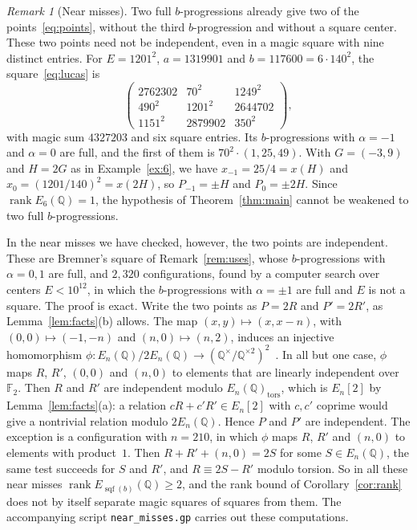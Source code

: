 \documentclass[11pt]{amsart}
\theoremstyle{definition}
\theoremstyle{remark}
\newtheorem{remark}[theorem]{Remark}
\newcommand{\Q}{\mathbb{Q}}
\DeclareMathOperator{\sqf}{sqf}
\DeclareMathOperator{\rk}{rank}
\begin{document}
\begin{remark}[Near misses]\label{rem:near}
Two full $b$-progressions already give two of the points~\eqref{eq:points}, without the third
$b$-progression and without a square center. These two points need not be independent, even in a magic
square with nine distinct entries. For $E=1201^2$, $a=1319901$ and $b=117600=6\cdot140^2$, the
square~\eqref{eq:lucas} is
\[
\begin{pmatrix}
2762302 & 70^2 & 1249^2\\
490^2 & 1201^2 & 2644702\\
1151^2 & 2879902 & 350^2
\end{pmatrix},
\]
with magic sum $4327203$ and six square entries. Its $b$-progressions with $\alpha=-1$ and $\alpha=0$ are
full, and the first of them is $70^2\cdot(1,25,49)$. With $G=(-3,9)$ and $H=2G$ as in
Example~\ref{ex:6}, we have $x_{-1}=25/4=x(H)$ and $x_0=(1201/140)^2=x(2H)$, so $P_{-1}=\pm H$ and
$P_0=\pm2H$. Since $\rk E_6(\Q)=1$, the hypothesis of Theorem~\ref{thm:main} cannot be weakened to two
full $b$-progressions.

In the near misses we have checked, however, the two points are independent. These are Bremner's square
of Remark~\ref{rem:uses}, whose $b$-progressions with $\alpha=0,1$ are full, and $2{,}320$ configurations,
found by a computer search over centers $E<10^{12}$, in which the $b$-progressions with $\alpha=\pm1$ are
full and $E$ is not a square. The proof is exact. Write the two points as $P=2R$ and $P'=2R'$, as
Lemma~\ref{lem:facts}(b) allows. The map $(x,y)\mapsto(x,x-n)$, with $(0,0)\mapsto(-1,-n)$ and
$(n,0)\mapsto(n,2)$, induces an injective homomorphism
$\phi\colon E_n(\Q)/2E_n(\Q)\to(\Q^\times/\Q^{\times2})^2$~\cite[Prop.~X.1.4]{AEC}. In all but one case,
$\phi$ maps $R$, $R'$, $(0,0)$ and $(n,0)$ to elements that are linearly independent over $\mathbb{F}_2$.
Then $R$ and $R'$ are independent modulo $E_n(\Q)_{\mathrm{tors}}$, which is $E_n[2]$ by
Lemma~\ref{lem:facts}(a): a relation $cR+c'R'\in E_n[2]$ with $c,c'$ coprime would give a nontrivial
relation modulo $2E_n(\Q)$. Hence $P$ and $P'$ are independent. The exception is a configuration with
$n=210$, in which $\phi$ maps $R$, $R'$ and $(n,0)$ to elements with product~$1$. Then
$R+R'+(n,0)=2S$ for some $S\in E_n(\Q)$, the same test succeeds for $S$ and $R'$, and $R\equiv2S-R'$
modulo torsion. So in all these near misses $\rk E_{\sqf(b)}(\Q)\ge2$,
and the rank bound of Corollary~\ref{cor:rank} does not by itself separate magic squares of squares from
them. The accompanying script \texttt{near\_misses.gp} carries out these computations.
\end{remark}
\end{document}
